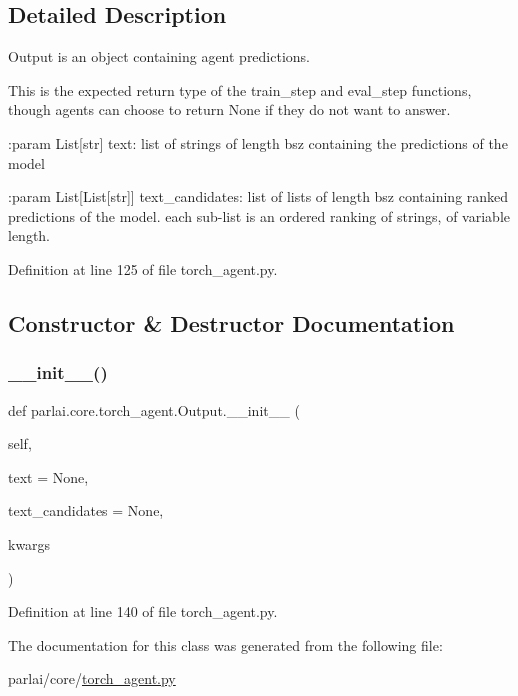 \subsection{Detailed Description}
\begin{DoxyVerb}Output is an object containing agent predictions.

This is the expected return type of the train_step and eval_step functions,
though agents can choose to return None if they do not want to answer.

:param List[str] text:
    list of strings of length bsz containing the predictions of the model

:param List[List[str]] text_candidates:
    list of lists of length bsz containing ranked predictions of the model.
    each sub-list is an ordered ranking of strings, of variable length.
\end{DoxyVerb}
 

Definition at line 125 of file torch\+\_\+agent.\+py.



\subsection{Constructor \& Destructor Documentation}
\mbox{\label{classparlai_1_1core_1_1torch__agent_1_1Output_a490f5e29040c643f20b63c23e7359627}} 
\subsubsection{\texorpdfstring{\+\_\+\+\_\+init\+\_\+\+\_\+()}{\_\_init\_\_()}}
{\footnotesize\ttfamily def parlai.\+core.\+torch\+\_\+agent.\+Output.\+\_\+\+\_\+init\+\_\+\+\_\+ (\begin{DoxyParamCaption}\item[{}]{self,  }\item[{}]{text = {\ttfamily None},  }\item[{}]{text\+\_\+candidates = {\ttfamily None},  }\item[{}]{kwargs }\end{DoxyParamCaption})}



Definition at line 140 of file torch\+\_\+agent.\+py.



The documentation for this class was generated from the following file\+:\begin{DoxyCompactItemize}
\item 
parlai/core/\hyperlink{torch__agent_8py}{torch\+\_\+agent.\+py}\end{DoxyCompactItemize}
